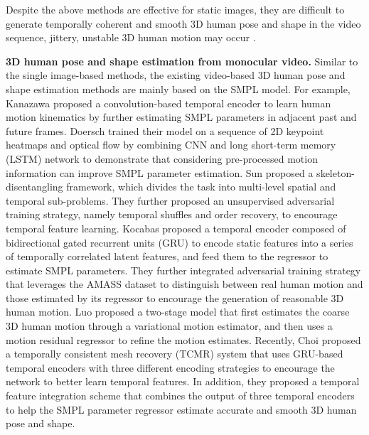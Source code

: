 \documentclass[10pt,twocolumn,letterpaper]{article}
\begin{document}
Despite the above methods are effective for static images, they are difficult to generate temporally coherent and smooth 3D human pose and shape in the video sequence, \ie jittery, unstable 3D human motion may occur \cite{Kocabas2020VIBEVI,choi2020beyond}.\vspace{3pt}

{\bf 3D human pose and shape estimation from monocular video.} Similar to the single image-based methods, the existing video-based 3D human pose and shape estimation methods are mainly based on the SMPL model. For example, Kanazawa \etal \cite{Kanazawa2019Learning3H} proposed a convolution-based temporal encoder to learn human motion kinematics by further estimating SMPL parameters in adjacent past and future frames. Doersch \etal \cite{Doersch2019Sim2realTL} trained their model on a sequence of 2D keypoint heatmaps and optical flow by combining CNN and long short-term memory (LSTM) network to demonstrate that considering pre-processed motion information can improve SMPL parameter estimation. Sun \etal \cite{Yu2019HumanMR} proposed a skeleton-disentangling framework, which divides the task into multi-level spatial and temporal sub-problems. They further proposed an unsupervised adversarial training strategy, namely temporal shuffles and order recovery, to encourage temporal feature learning. Kocabas \etal \cite{Kocabas2020VIBEVI} proposed a temporal encoder composed of bidirectional gated recurrent units (GRU) to encode static features into a series of temporally correlated latent features, and feed them to the regressor to estimate SMPL parameters. They further integrated adversarial training strategy that leverages the AMASS dataset \cite{Mahmood2019AMASSAO} to distinguish between real human motion and those estimated by its regressor to encourage the generation of reasonable 3D human motion. Luo \etal \cite{Luo_2020_ACCV} proposed a two-stage model that first estimates the coarse 3D human motion through a variational motion estimator, and then uses a motion residual regressor to refine the motion estimates. Recently, Choi \etal \cite{choi2020beyond} proposed a temporally consistent mesh recovery (TCMR) system that uses GRU-based temporal encoders with three different encoding strategies to encourage the network to better learn temporal features. In addition, they proposed a temporal feature integration scheme that combines the output of three temporal encoders to help the SMPL parameter regressor estimate accurate and smooth 3D human pose and shape.\vspace{-1pt}
\end{document}
